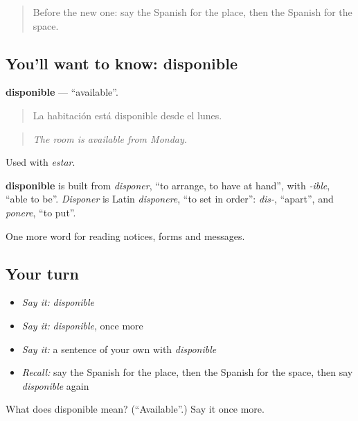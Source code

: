 \label{lesson:ES-C478-disponible}



\begin{quote}
Before the new one: say the Spanish for the place, then the Spanish for the space.
\end{quote}

\subsection*{You'll want to know: disponible}
\textbf{disponible} — \textquotedblleft{}available\textquotedblright{}.

\begin{quote}
La habitación está disponible desde el lunes.
\end{quote}

\begin{quote}
\emph{The room is available from Monday.}
\end{quote}

Used with \emph{estar}.

\begin{cousinweb}
\textbf{disponible} is built from \emph{disponer}, \textquotedblleft{}to arrange, to have at hand\textquotedblright{}, with \emph{-ible}, \textquotedblleft{}able to be\textquotedblright{}. \emph{Disponer} is Latin \emph{disponere}, \textquotedblleft{}to set in order\textquotedblright{}: \emph{dis-}, \textquotedblleft{}apart\textquotedblright{}, and \emph{ponere}, \textquotedblleft{}to put\textquotedblright{}.
\end{cousinweb}

\begin{grammarlens}[title={What you've built}]
One more word for reading notices, forms and messages.
\end{grammarlens}

\subsection*{Your turn}
\begin{itemize}
\raggedright
  \item \emph{Say it:} \emph{disponible}
  \item \emph{Say it:} \emph{disponible}, once more
  \item \emph{Say it:} a sentence of your own with \emph{disponible}
  \item \emph{Recall:} say the Spanish for the place, then the Spanish for the space, then say \emph{disponible} again
\end{itemize}

\begin{tcolorbox}[breakable,colback=teal!4,colframe=teal!35!black,title={Before you move on}]
What does disponible mean? (\textquotedblleft{}Available\textquotedblright{}.) Say it once more.
\end{tcolorbox}
